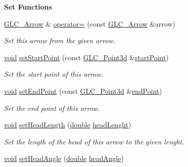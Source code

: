 \begin{Indent}{\bf Set Functions}\par
\begin{DoxyCompactItemize}
\item 
\hyperlink{class_g_l_c___arrow}{G\-L\-C\-\_\-\-Arrow} \& \hyperlink{class_g_l_c___arrow_abe1c80b5f965f59724250e80b472d951}{operator=} (const \hyperlink{class_g_l_c___arrow}{G\-L\-C\-\_\-\-Arrow} \&arrow)
\begin{DoxyCompactList}\small\item\em Set this arrow from the given arrow. \end{DoxyCompactList}\item 
\hyperlink{group___u_a_v_objects_plugin_ga444cf2ff3f0ecbe028adce838d373f5c}{void} \hyperlink{class_g_l_c___arrow_a3cd4c352f428065ffbefd461b75fae03}{set\-Start\-Point} (const \hyperlink{glc__vector3d_8h_a4e13a9bbc7ab3d34de7e98b41836772c}{G\-L\-C\-\_\-\-Point3d} \&\hyperlink{class_g_l_c___arrow_a6d2bcdd639b9ada7f6c2609ef3c2d6d2}{start\-Point})
\begin{DoxyCompactList}\small\item\em Set the start point of this arrow. \end{DoxyCompactList}\item 
\hyperlink{group___u_a_v_objects_plugin_ga444cf2ff3f0ecbe028adce838d373f5c}{void} \hyperlink{class_g_l_c___arrow_ab07681f02b4dd6d98ce1b57a9f0ccb71}{set\-End\-Point} (const \hyperlink{glc__vector3d_8h_a4e13a9bbc7ab3d34de7e98b41836772c}{G\-L\-C\-\_\-\-Point3d} \&\hyperlink{class_g_l_c___arrow_af850396d971329d424a9ce1c9efe37dd}{end\-Point})
\begin{DoxyCompactList}\small\item\em Set the end point of this arrow. \end{DoxyCompactList}\item 
\hyperlink{group___u_a_v_objects_plugin_ga444cf2ff3f0ecbe028adce838d373f5c}{void} \hyperlink{class_g_l_c___arrow_a7747c01cca164427acc09a36e59d6d81}{set\-Head\-Length} (\hyperlink{_super_l_u_support_8h_a8956b2b9f49bf918deed98379d159ca7}{double} \hyperlink{class_g_l_c___arrow_ab96db90473454391c06179eb7713a19b}{head\-Lenght})
\begin{DoxyCompactList}\small\item\em Set the length of the head of this arrow to the given lenght. \end{DoxyCompactList}\item 
\hyperlink{group___u_a_v_objects_plugin_ga444cf2ff3f0ecbe028adce838d373f5c}{void} \hyperlink{class_g_l_c___arrow_a7d736e61f944e5b890e2a85d726dac05}{set\-Head\-Angle} (\hyperlink{_super_l_u_support_8h_a8956b2b9f49bf918deed98379d159ca7}{double} \hyperlink{class_g_l_c___arrow_a9cfaf08a4856518903b9ed5fe500d127}{head\-Angle})

\end{DoxyCompactItemize}
\end{Indent}
